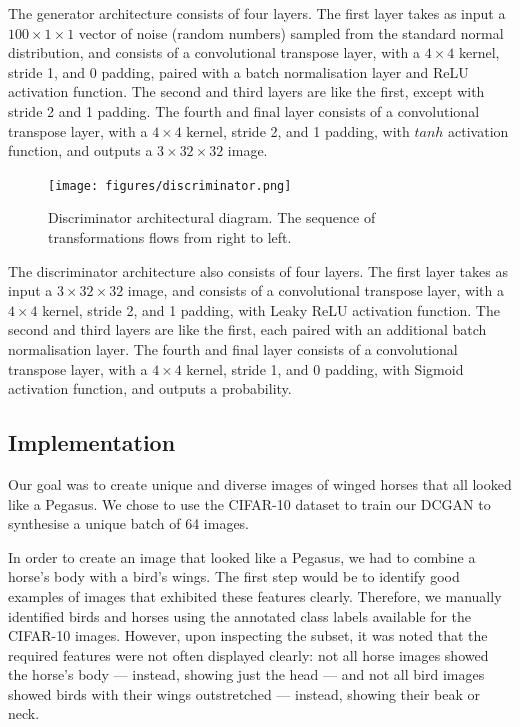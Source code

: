 \documentclass{article}
\begin{document}
The generator architecture consists of four layers. The first layer takes as input a $100 \times 1 \times 1$ vector of noise (random numbers) sampled from the standard normal distribution, and consists of a convolutional transpose layer, with a $4 \times 4$ kernel, stride 1, and 0 padding, paired with a batch normalisation layer and ReLU activation function. The second and third layers are like the first, except with stride 2 and 1 padding. The fourth and final layer consists of a convolutional transpose layer, with a $4 \times 4$ kernel, stride 2, and 1 padding, with $tanh$ activation function, and outputs a $3 \times 32 \times 32$ image.  

\begin{figure}[h]
    \begin{center}
        \texttt{[image: figures/discriminator.png]}
    \end{center}
    \caption{Discriminator architectural diagram. The sequence of transformations flows from right to left.}
    \label{fig:discriminator}
\end{figure}

The discriminator architecture also consists of four layers. The first layer takes as input a $3 \times 32 \times 32$ image, and consists of a convolutional transpose layer, with a $4 \times 4$ kernel, stride 2, and 1 padding, with Leaky ReLU activation function. The second and third layers are like the first, each paired with an additional batch normalisation layer. The fourth and final layer consists of a convolutional transpose layer, with a $4 \times 4$ kernel, stride 1, and 0 padding, with Sigmoid activation function, and outputs a probability. 

\subsection{Implementation} \label{implementation}
Our goal was to create unique and diverse images of winged horses that all looked like a Pegasus. We chose to use the CIFAR-10 dataset to train our DCGAN to synthesise a unique batch of 64 images.

In order to create an image that looked like a Pegasus, we had to combine a horse's body with a bird's wings. The first step would be to identify good examples of images that exhibited these features clearly. Therefore, we manually identified birds and horses using the annotated class labels available for the CIFAR-10 images. However, upon inspecting the subset, it was noted that the required features were not often displayed clearly: not all horse images showed the horse's body --- instead, showing just the head --- and not all bird images showed birds with their wings outstretched --- instead, showing their beak or neck. 
\end{document}
